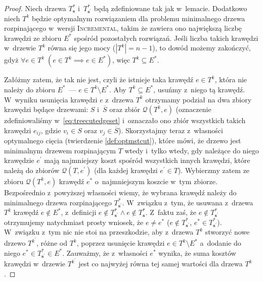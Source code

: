 \begin{proof}
	Niech drzewa $T^{\ast}_{\textbf{s}}$ i~$T^{\ast}_{\textbf{s}^{\prime}}$ będą zdefiniowane tak jak w~lemacie.
	Dodatkowo niech $T^{k}$ będzie optymalnym rozwiązaniem dla problemu minimalnego drzewa rozpinającego w~wersji \textsc{Incremental}, takim że zawiera ono największą liczbę krawędzi ze zbioru $E^{\ast}$ spośród pozostałych rozwiązań.
	Jeśli liczba takich krawędzi w~drzewie $T^{k}$ równa się jego mocy ($\left| T^{k} \right| = n - 1$), to dowód możemy zakończyć, gdyż $\forall e \in T^{k} \; \left( e \in T^{k} \implies e \in E^{\ast} \right)$, więc $T^{k} \subseteq E^{\ast}$.
	
	Załóżmy zatem, że tak nie jest, czyli że istnieje taka krawędź $e \in T^{k}$, która nie należy do zbioru $E^{\ast}$~--- $e \in T^{k} \setminus E^{\ast}$.
	Aby $T^{k} \subseteq E^{\ast}$, usuńmy z~niego tą krawędź.
	W~wyniku usunięcia krawędzi $e$ z~drzewa $T^{k}$ otrzymamy podział na dwa zbiory krawędzi będące drzewami: $S$ i~$\overline{S}$ oraz zbiór $\mathcal{Q} \left( T^{k}, e \right)$ (oznaczenie zdefiniowaliśmy w~\ref{eq:treecutedgeset} i~oznaczało ono zbiór wszystkich takich krawędzi $e_{ij}$, gdzie $v_{i} \in S$ oraz $v_{j} \in \overline{S}$).
	Skorzystajmy teraz z~własności optymalnego cięcia (twierdzenie \ref{def:optmstcut}), które mówi, że drzewo jest minimalnym drzewem rozpinającym $T$ wtedy i~tylko wtedy, gdy należące do niego krawędzie $e^{\prime}$ mają najmniejszy koszt spośród wszystkich innych krawędzi, które należą do zbiorów $\mathcal{Q} \left( T, e^{\prime} \right)$ (dla każdej krawędzi $e^{\prime} \in T$).
	Wybierzmy zatem ze zbioru $\mathcal{Q} \left( T^{k}, e \right)$ krawędź $e^{\ast}$ o~najmniejszym koszcie w~tym zbiorze. 
	Bezpośrednio z~powyższej własności wiemy, że wybrana krawędź należy do minimalnego drzewa rozpinającego $T^{\ast}_{\textbf{s}^{\prime}}$.
	W~związku z~tym, że usuwana z~drzewa $T^{k}$ krawędź $e \notin E^{\ast}$, z~definicji $e \notin T^{\ast}_{\textbf{s}^{\prime}} \wedge e \notin T^{\ast}_{\textbf{s}}$.
	Z~faktu zaś, że $e \notin T^{\ast}_{\textbf{s}^{\prime}}$ otrzymujemy natychmiast prosty wniosek, że $e \neq e^{\ast}$ ($e \notin T^{\ast}_{\textbf{s}^{\prime}}$, $e^{\ast} \in T^{\ast}_{\textbf{s}^{\prime}}$).
	W~związku z~tym nic nie stoi na przeszkodzie, aby z~drzewa $T^{k}$ stworzyć nowe drzewo $T^{k^{\prime}}$, różne od $T^{k}$, poprzez usunięcie krawędzi $e \in T^{k} \setminus E^{\ast}$ a~dodanie do niego $e^{\ast} \in T^{\ast}_{\textbf{s}^{\prime}} \in E^{\ast}$. 
	Zauważmy, że z~własności $e^{\ast}$ wynika, że suma kosztów krawędzi w~drzewie $T^{k^{\prime}}$ jest co najwyżej równa tej samej wartości dla drzewa $T^{k}$.

\end{proof}
